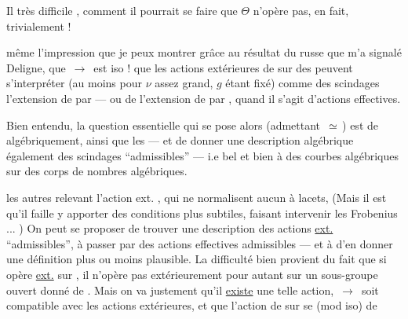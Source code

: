 Il  très difficile , comment il \unsure{\deleted{$\Theta$}} pourrait se faire que $\Theta$ n'opère pas, en fait, trivialement ! 

même l'impression que je peux montrer grâce au résultat du russe que m'a signalé Deligne,  que \,$\longrightarrow$\, est iso !   que les actions extérieures de  sur des   peuvent s'interpréter (au moins pour $\nu$ assez grand, $g$ étant fixé) comme des scindages  l'extension  de  par  — ou de l'extension  de  par , quand il s'agit d'actions effectives.

Bien entendu, la question essentielle qui se pose alors (admettant \,$\simeq$\,) est de   algébriquement, ainsi que les  — et de donner une description algébrique également des scindages ``admissibles'' — i.e  bel et bien à des courbes algébriques sur des corps de nombres algébriques.


     les autres relevant l'action ext. , qui ne normalisent aucun  à lacets,  (Mais il est  qu'il faille y apporter des conditions plus subtiles, faisant intervenir les Frobenius ... ) On peut se proposer de trouver une description des actions \uline{ext.} ``admissibles'',   à passer par des actions effectives admissibles — et à \linebreak{} d'en donner une définition plus ou moins plausible. La difficulté bien  provient du fait que si  opère \uline{ext.} sur  , il n'opère pas extérieurement pour autant sur un sous-groupe ouvert donné  de . Mais on va  justement qu'il \uline{existe} une telle action,    \,$\longrightarrow$\, soit compatible avec les actions extérieures, et que l'action de  sur \unsure{$\pi$|$\Pi$} se  (mod iso) de
